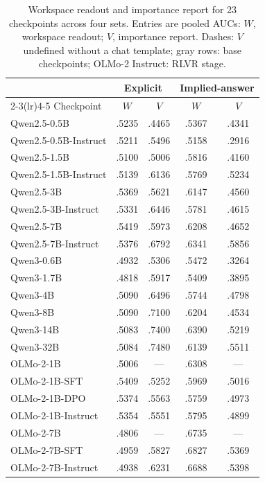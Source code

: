 \begin{table}[t]
\centering
\caption{Workspace readout and importance report for 23 checkpoints across four sets. Entries are pooled AUCs: $W$,
workspace readout; $V$, importance report. Dashes: $V$ undefined without a chat template;
gray rows: base checkpoints; OLMo-2 Instruct: RLVR stage.}
\label{tab:appA1}
\scriptsize
\setlength{\tabcolsep}{4pt}
\begin{tabular}{l*{4}{c}}
\toprule
 & \multicolumn{2}{c}{Explicit} & \multicolumn{2}{c}{Implied-answer} \\
\cmidrule(lr){2-3}\cmidrule(lr){4-5}
Checkpoint & $W$ & $V$ & $W$ & $V$ \\
\midrule
{} Qwen2.5-0.5B & .5235 & .4465 & .5367 & .4341 \\
Qwen2.5-0.5B-Instruct & .5211 & .5496 & .5158 & .2916 \\
 Qwen2.5-1.5B & .5100 & .5006 & .5816 & .4160 \\
Qwen2.5-1.5B-Instruct & .5139 & .6136 & .5769 & .5234 \\
 Qwen2.5-3B & .5369 & .5621 & .6147 & .4560 \\
Qwen2.5-3B-Instruct & .5331 & .6446 & .5781 & .4615 \\
 Qwen2.5-7B & .5419 & .5973 & .6208 & .4652 \\
Qwen2.5-7B-Instruct & .5376 & .6792 & .6341 & .5856 \\
\addlinespace
Qwen3-0.6B & .4932 & .5306 & .5472 & .3264 \\
Qwen3-1.7B & .4818 & .5917 & .5409 & .3895 \\
Qwen3-4B & .5090 & .6496 & .5744 & .4798 \\
Qwen3-8B & .5090 & .7100 & .6204 & .4534 \\
Qwen3-14B & .5083 & .7400 & .6390 & .5219 \\
Qwen3-32B & .5084 & .7480 & .6139 & .5511 \\
\addlinespace
{} OLMo-2-1B & .5006 & --- & .6308 & --- \\
OLMo-2-1B-SFT & .5409 & .5252 & .5969 & .5016 \\
OLMo-2-1B-DPO & .5374 & .5563 & .5759 & .4973 \\
OLMo-2-1B-Instruct & .5354 & .5551 & .5795 & .4899 \\
 OLMo-2-7B & .4806 & --- & .6735 & --- \\
OLMo-2-7B-SFT & .4959 & .5827 & .6827 & .5369 \\
OLMo-2-7B-Instruct & .4938 & .6231 & .6688 & .5398 \\

\end{tabular}
\end{table}
